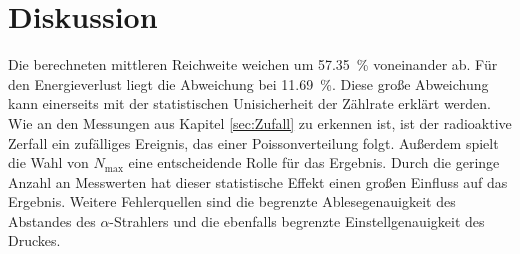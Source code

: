 \section{Diskussion}
\label{sec:Diskussion}

Die berechneten mittleren Reichweite weichen um \SI{57.35}{\percent} voneinander ab.
Für den Energieverlust liegt die Abweichung bei \SI{11.69}{\percent}.
Diese große Abweichung kann einerseits mit der statistischen Unisicherheit der Zählrate erklärt werden.
Wie an den Messungen aus Kapitel \ref{sec:Zufall} zu erkennen ist, ist der radioaktive Zerfall ein zufälliges Ereignis,
das einer Poissonverteilung folgt.
Außerdem spielt die Wahl von $N_\text{max}$ eine entscheidende Rolle für das Ergebnis.
Durch die geringe Anzahl an Messwerten hat dieser statistische Effekt einen großen Einfluss auf das Ergebnis.
Weitere Fehlerquellen sind die begrenzte Ablesegenauigkeit des Abstandes des $\alpha$-Strahlers und
die ebenfalls begrenzte Einstellgenauigkeit des Druckes.
